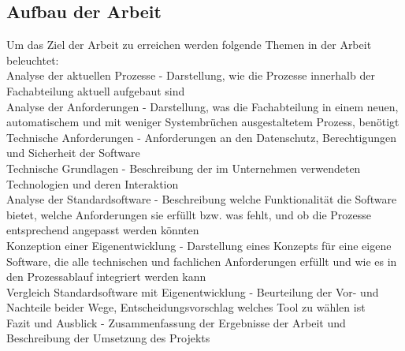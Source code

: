\subsection{Aufbau der Arbeit}
Um das Ziel der Arbeit zu erreichen werden folgende Themen in der Arbeit beleuchtet:
\\ [10pt] Analyse der aktuellen Prozesse - Darstellung, wie die Prozesse innerhalb der Fachabteilung aktuell aufgebaut sind
\\ [10pt] Analyse der Anforderungen - Darstellung, was die Fachabteilung in einem neuen, automatischem und mit weniger Systembrüchen ausgestaltetem Prozess, benötigt
\\ [10pt] Technische Anforderungen - Anforderungen an den Datenschutz, Berechtigungen und Sicherheit der Software
\\ [10pt] Technische Grundlagen - Beschreibung der im Unternehmen verwendeten Technologien und deren Interaktion
\\ [10pt] Analyse der Standardsoftware - Beschreibung welche Funktionalität die Software bietet, welche Anforderungen sie erfüllt bzw. was fehlt, und ob die Prozesse entsprechend angepasst werden könnten
\\ [10pt] Konzeption einer Eigenentwicklung - Darstellung eines Konzepts für eine eigene Software, die alle technischen und fachlichen Anforderungen erfüllt und wie es in den Prozessablauf integriert werden kann
\\ [10pt] Vergleich Standardsoftware mit Eigenentwicklung - Beurteilung der Vor- und Nachteile beider Wege, Entscheidungsvorschlag welches Tool zu wählen ist
\\ [10pt] Fazit und Ausblick - Zusammenfassung der Ergebnisse der Arbeit und Beschreibung der Umsetzung des Projekts